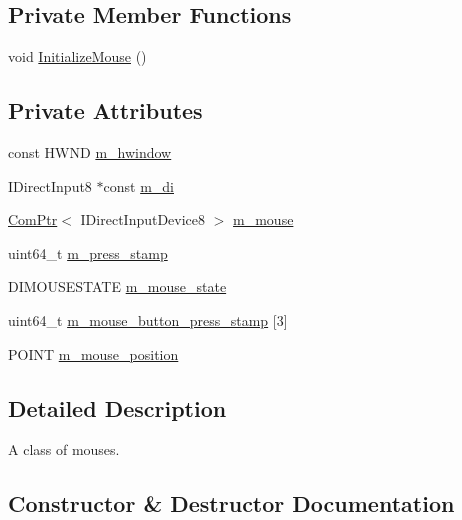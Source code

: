 \subsection*{Private Member Functions}
\begin{DoxyCompactItemize}
\item 
void \hyperlink{classmage_1_1_mouse_ac158b6d6fff5b05dea5ebefa86c0d56a}{Initialize\+Mouse} ()
\end{DoxyCompactItemize}
\subsection*{Private Attributes}
\begin{DoxyCompactItemize}
\item 
const H\+W\+ND \hyperlink{classmage_1_1_mouse_a51592b367595f8ed772266104fc813c5}{m\+\_\+hwindow}
\item 
I\+Direct\+Input8 $\ast$const \hyperlink{classmage_1_1_mouse_a892a9e1d5ad16ac9b67a5f69fbfedeab}{m\+\_\+di}
\item 
\hyperlink{namespacemage_ae74f374780900893caa5555d1031fd79}{Com\+Ptr}$<$ I\+Direct\+Input\+Device8 $>$ \hyperlink{classmage_1_1_mouse_a3f2803f3c0e008f5d764a11de3dbe098}{m\+\_\+mouse}
\item 
uint64\+\_\+t \hyperlink{classmage_1_1_mouse_a32b30d3c37a2082869f4ff4f522dfbf8}{m\+\_\+press\+\_\+stamp}
\item 
D\+I\+M\+O\+U\+S\+E\+S\+T\+A\+TE \hyperlink{classmage_1_1_mouse_af99645fb4226077abee4532a5e663066}{m\+\_\+mouse\+\_\+state}
\item 
uint64\+\_\+t \hyperlink{classmage_1_1_mouse_a0f5a38e23bdf7eae1b7b1030a53edff0}{m\+\_\+mouse\+\_\+button\+\_\+press\+\_\+stamp} \mbox{[}3\mbox{]}
\item 
P\+O\+I\+NT \hyperlink{classmage_1_1_mouse_a2a8332ef7a4daa0f9ed48a9a1ad80684}{m\+\_\+mouse\+\_\+position}
\end{DoxyCompactItemize}


\subsection{Detailed Description}
A class of mouses. 

\subsection{Constructor \& Destructor Documentation}
\hypertarget{classmage_1_1_mouse_ad02365977dab44603400ac6f24e0df97}{}\label{classmage_1_1_mouse_ad02365977dab44603400ac6f24e0df97} 
